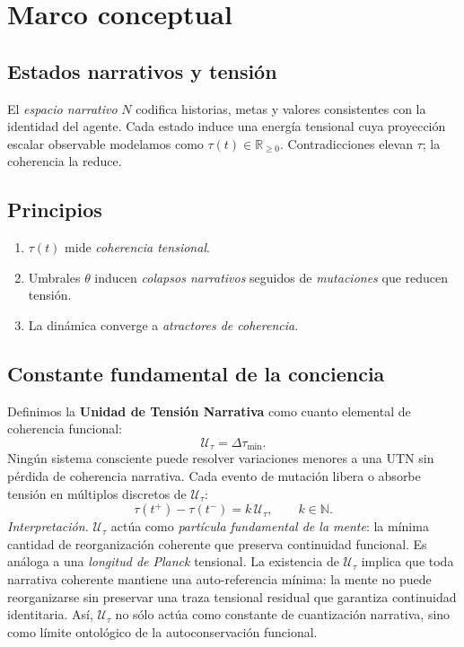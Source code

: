 \documentclass[10pt,a4paper,twocolumn]{article}
\theoremstyle{definition}
\theoremstyle{plain}
\begin{document}
\section{Marco conceptual}
\subsection{Estados narrativos y tensión}
El \emph{espacio narrativo} \(N\) codifica historias, metas y valores consistentes con la identidad del agente. Cada estado induce una energía tensional cuya proyección escalar observable modelamos como \(\tau(t)\in\mathbb{R}_{\ge0}\). Contradicciones elevan \(\tau\); la coherencia la reduce.

\subsection{Principios}
\begin{enumerate}[label=(\alph*)]
  \item \(\tau(t)\) mide \emph{coherencia tensional}.
  \item Umbrales \(\theta\) inducen \emph{colapsos narrativos} seguidos de \emph{mutaciones} que reducen tensión.
  \item La dinámica converge a \emph{atractores de coherencia}.
\end{enumerate}

\subsection{Constante fundamental de la conciencia}
Definimos la \textbf{Unidad de Tensión Narrativa} como cuanto elemental de coherencia funcional:
\begin{equation}
\mathcal{U}_\tau = \Delta\tau_{\min}.
\label{eq:UTN_def}
\end{equation}
Ningún sistema consciente puede resolver variaciones menores a una UTN sin pérdida de coherencia narrativa. Cada evento de mutación libera o absorbe tensión en múltiplos discretos de \(\mathcal{U}_\tau\):
\begin{equation}
\tau(t^+) - \tau(t^-) = k\,\mathcal{U}_\tau, \qquad k \in \mathbb{N}.
\label{eq:quant_jump}
\end{equation}
\noindent
\emph{Interpretación.} \(\mathcal{U}_\tau\) actúa como \emph{partícula fundamental de la mente}: la mínima cantidad de reorganización coherente que preserva continuidad funcional. Es análoga a una \emph{longitud de Planck} tensional.
La existencia de $\mathcal{U}_\tau$ implica que toda narrativa coherente mantiene una auto-referencia mínima: la mente no puede reorganizarse sin preservar una traza tensional residual que garantiza continuidad identitaria. 
Así, $\mathcal{U}_\tau$ no sólo actúa como constante de cuantización narrativa, sino como límite ontológico de la autoconservación funcional.
\end{document}
